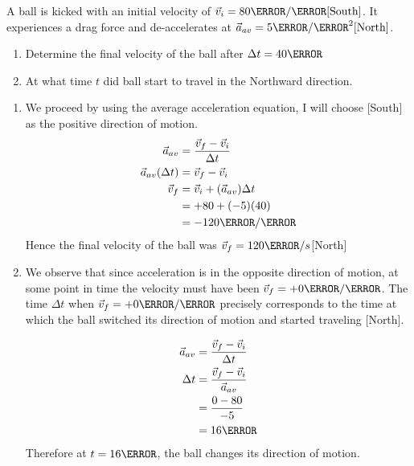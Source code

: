 \documentclass[12pt]{article} %
\newcommand{\tx}[1]{\text{#1}}
\begin{document}
\begin{qstn}[6]
 A ball is kicked with an initial velocity of $\vec v_i = 80 \m / \s \tx{[South]}$. It experiences a drag force and de-accelerates at $\vec a_{av} = 5 \m / \s^2 \tx{[North]}$.
            \begin{enumerate}[label = (\alph*)]
                \item Determine the final velocity of the ball after $\Delta t = 40\s$
                \item At what time $t$ did ball start to travel in the Northward direction.
            \end{enumerate}


    \begin{soln}
        \begin{enumerate}[label = (\alph*)]
            \item We proceed by using the average acceleration equation, I will choose [South] as the positive direction of motion. 
            \begin{align*}
                \vec a_{av} &= \frac{\vec v_f - \vec v_i}{\Delta t}\\
                \vec a_{av}(\Delta t) &= \vec v_f - \vec v_i \\
                \vec v_f &= \vec v_i + (\vec a_{av})\Delta t \\
                &= +80 + (-5)(40)\\
                &= -120 \m / \s
            \end{align*}
            Hence the final velocity of the ball was $\vec v_f = 120 \m / s$[North]


            \item We observe that since acceleration is in the opposite direction of motion, at some point in time the velocity must have been $\vec v_f = +0 \m / \s$. The time $\Delta t$ when $\vec v_f = +0 \m / \s$ precisely corresponds to the time at which the ball switched its direction of motion and started traveling [North].

            \begin{align*}
                \vec a_{av} &= \frac{\vec v_f - \vec v_i}{\Delta t}\\
                \Delta t &= \frac{\vec v_f - \vec v_i}{\vec a_{av}}\\
                &= \frac{0 - 80}{-5}\\
                &= 16\s
            \end{align*}
            Therefore at $t = 16\s$, the ball changes its direction of motion.

        \end{enumerate}

    \end{soln}


\end{qstn}
        
\end{document}
